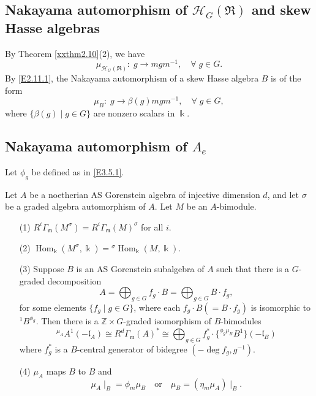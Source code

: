 \subsection{Nakayama automorphism of ${\mathcal H}_G(\Re)$ and skew Hasse algebras}
\label{xxsec4.0}
By Theorem \ref{xxthm2.10}(2), we have
\begin{equation}
\label{E4.0.1}\tag{E4.0.1}
\mu_{{\mathcal H}_G(\Re)}: \; 
g\to mgm^{-1}, \quad \forall \; g\in G.
\end{equation}
By \eqref{E2.11.1}, the Nakayama automorphism of a
skew Hasse algebra $B$ is of the form
\begin{equation}
\label{E4.0.2}\tag{E4.0.2}
\mu_{B}: \; 
g\to \beta(g) mgm^{-1}, \quad \forall \; g\in G,
\end{equation}
where $\{\beta(g) \mid g\in G\}$ are nonzero scalars in $\Bbbk$.

\subsection{Nakayama automorphism of $A_e$}
\label{xxsec4.1}

Let $\phi_g$ be defined as in \eqref{E3.5.1}.

\begin{lemma}
\label{xxlem4.1} Let $A$ be a noetherian AS Gorenstein 
algebra of injective dimension $d$, 
and let $\sigma$ be a graded algebra automorphism
of $A$. Let $M$ be an $A$-bimodule. 
\begin{enumerate}
\item[(1)]
$R^i\Gamma_{\mathfrak{m}}(M^{\sigma})=R^i\Gamma_{\mathfrak{m}}(M)^{\sigma}$ for all $i$.
\item[(2)]
$\operatorname{Hom}_{\Bbbk}(M^{\sigma}, \Bbbk)={^\sigma \operatorname{Hom}_{\Bbbk}(M, \Bbbk)}$.
\item[(3)]
Suppose $B$ is an AS Gorenstein subalgebra of $A$ such that
there is a $G$-graded decomposition
$$A=\bigoplus_{g\in G} f_g \cdot B=\bigoplus_{g\in G} B \cdot f_g,$$
for some elements $\{f_g\mid g\in G\}$,
where each $f_g\cdot B(=B\cdot f_g)$ is isomorphic to ${^1 B^{\phi_g}}$. Then 
there is a ${\mathbb Z}\times G$-graded isomorphism of $B$-bimodules
\begin{equation}
\label{E4.1.1}\tag{E4.1.1}{^{\mu_A} A^1} (-{\mathfrak l}_A)\cong R^d \Gamma_{\mathfrak{m}}(A)^*
\cong \bigoplus_{g\in G} f_g^{\ast} 
\cdot \{^{\phi_g \mu_B} B^1 \}(-{\mathfrak l}_B)
\end{equation}
where $f_g^*$ is a $B$-central generator of bidegree 
$(-\deg f_g,g^{-1})$. 
\item[(4)]
$\mu_A$ maps $B$ to $B$ and 
$$\mu_A\mid_B=\phi_{m}\mu_B
\quad {\text{or}}\quad
\mu_B=(\eta_m \mu_A)\mid_{B}.$$
\end{enumerate}
\end{lemma}

